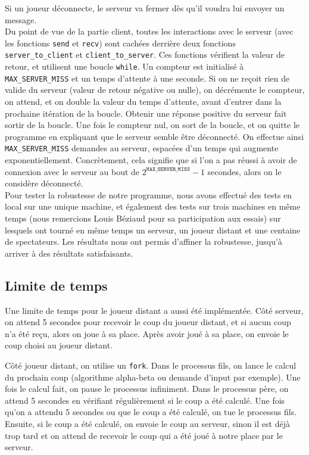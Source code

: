 \documentclass[a4paper]{article}
\begin{document}
Si un joueur déconnecte, le serveur va fermer dès qu'il voudra lui envoyer un message. \\

Du point de vue de la partie client, toutes les interactions avec le serveur 
(avec les fonctions \texttt{send} et \texttt{recv}) sont cachées derrière deux 
fonctions \texttt{server\_to\_client} et \texttt{client\_to\_server}. Ces 
fonctions vérifient la valeur de retour, et utilisent une boucle 
\texttt{while}. Un compteur est initialisé à \texttt{MAX\_SERVER\_MISS} et un 
temps d'attente à une seconde. Si on ne reçoit rien de valide du serveur 
(valeur de retour négative ou nulle), on décrémente le compteur, on attend, et 
on double la valeur du temps d'attente, avant d'entrer dans la prochaine 
itération de la boucle. Obtenir une réponse positive du serveur fait sortir de 
la boucle. Une fois le compteur nul, on sort de la boucle, et on quitte le 
programme en expliquant que le serveur semble être déconnecté. On effectue 
ainsi \texttt{MAX\_SERVER\_MISS} demandes au serveur, espacées d'un temps qui 
augmente exponentiellement. Concrètement, cela signifie que si l'on a pas 
réussi à avoir de connexion avec le serveur au bout de 
$2^{\texttt{MAX\_SERVER\_MISS}} - 1$ secondes, alors on le considère déconnecté. \\

Pour tester la robustesse de notre programme, nous avons effectué des tests en local sur une unique machine,
et également des tests sur trois machines en même temps (nous remercions Louis Béziaud pour sa participation aux essais)
sur lesquels ont tourné en même temps un serveur, un joueur distant et une centaine de spectateurs.
Les résultats nous ont permis d'affiner la robustesse, jusqu'à arriver à des résultats satisfaisants.


\subsection{Limite de temps}

Une limite de temps pour le joueur distant a aussi été implémentée. Côté 
serveur, on attend 5 secondes pour recevoir le coup du joueur distant, et si 
aucun coup n'a été reçu, alors on joue à sa place. Après avoir joué à sa place, 
on envoie le coup choisi au joueur distant.

Côté joueur distant, on utilise un \texttt{fork}. Dans le processus fils, on 
lance le calcul du prochain coup (algorithme alpha-beta ou demande d'input par 
exemple). Une fois le calcul fait, on pause le processus infiniment. Dans le 
processus père, on attend 5 secondes en vérifiant régulièrement si le coup a 
été calculé. Une fois qu'on a attendu 5 secondes ou que le coup a été calculé, 
on tue le processus fils. Ensuite, si le coup a été calculé, on envoie le coup 
au serveur, sinon il est déjà trop tard et on attend de recevoir le coup qui a 
été joué à notre place par le serveur.
\end{document}
